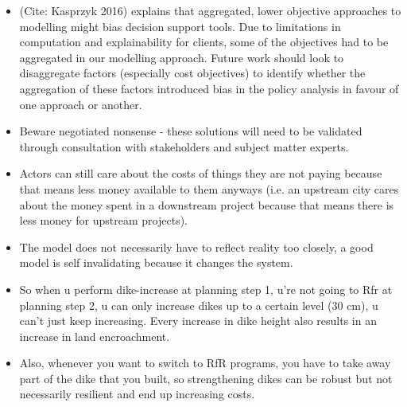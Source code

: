 \begin{itemize}
    \item (Cite: Kasprzyk 2016) explains that aggregated, lower objective approaches to modelling might bias decision support tools. Due to limitations in computation and explainability for clients, some of the objectives had to be aggregated in our modelling approach. Future work should look to disaggregate factors (especially cost objectives) to identify whether the aggregation of these factors introduced bias in the policy analysis in favour of one approach or another.
    \item Beware negotiated nonsense - these solutions will need to be validated through consultation with stakeholders and subject matter experts.
    \item Actors can still care about the costs of things they are not paying because that means less money available to them anyways (i.e. an upstream city cares about the money spent in a downstream project because that means there is less money for upstream projects).
    \item The model does not necessarily have to reflect reality too closely, a good model is self invalidating because it changes the system.
    
    
    
    \item So when u perform dike-increase at planning step 1, u're not going to Rfr at planning step 2, u can only increase dikes up to a certain level (30 cm), u can't just keep increasing. Every increase in dike height also results in an increase in land encroachment.
    \item Also, whenever you want to switch to RfR programs, you have to take away part of the dike that you built, so strengthening dikes can be robust but not necessarily resilient and end up increasing costs.
\end{itemize}